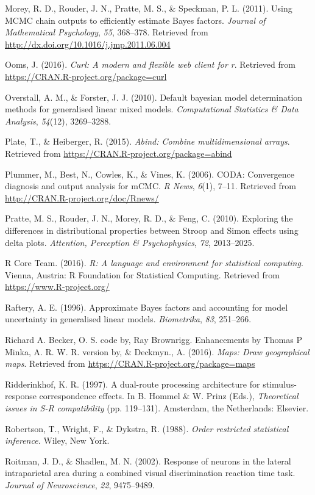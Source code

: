 \documentclass[american,man]{apa6}
\begin{document}
Morey, R. D., Rouder, J. N., Pratte, M. S., \& Speckman, P. L. (2011).
Using MCMC chain outputs to efficiently estimate Bayes factors.
\emph{Journal of Mathematical Psychology}, \emph{55}, 368--378.
Retrieved from \url{http://dx.doi.org/10.1016/j.jmp.2011.06.004}

Ooms, J. (2016). \emph{Curl: A modern and flexible web client for r}.
Retrieved from \url{https://CRAN.R-project.org/package=curl}

Overstall, A. M., \& Forster, J. J. (2010). Default bayesian model
determination methods for generalised linear mixed models.
\emph{Computational Statistics \& Data Analysis}, \emph{54}(12),
3269--3288.

Plate, T., \& Heiberger, R. (2015). \emph{Abind: Combine
multidimensional arrays}. Retrieved from
\url{https://CRAN.R-project.org/package=abind}

Plummer, M., Best, N., Cowles, K., \& Vines, K. (2006). CODA:
Convergence diagnosis and output analysis for mCMC. \emph{R News},
\emph{6}(1), 7--11. Retrieved from
\url{http://CRAN.R-project.org/doc/Rnews/}

Pratte, M. S., Rouder, J. N., Morey, R. D., \& Feng, C. (2010).
Exploring the differences in distributional properties between Stroop
and Simon effects using delta plots. \emph{Attention, Perception \&
Psychophysics}, \emph{72}, 2013--2025.

R Core Team. (2016). \emph{R: A language and environment for statistical
computing}. Vienna, Austria: R Foundation for Statistical Computing.
Retrieved from \url{https://www.R-project.org/}

Raftery, A. E. (1996). Approximate Bayes factors and accounting for
model uncertainty in generalised linear models. \emph{Biometrika},
\emph{83}, 251--266.

Richard A. Becker, O. S. code by, Ray Brownrigg. Enhancements by Thomas
P Minka, A. R. W. R. version by, \& Deckmyn., A. (2016). \emph{Maps:
Draw geographical maps}. Retrieved from
\url{https://CRAN.R-project.org/package=maps}

Ridderinkhof, K. R. (1997). A dual-route processing architecture for
stimulus-response correspondence effects. In B. Hommel \& W. Prinz
(Eds.), \emph{Theoretical issues in S-R compatibility} (pp. 119--131).
Amsterdam, the Netherlands: Elsevier.

Robertson, T., Wright, F., \& Dykstra, R. (1988). \emph{Order restricted
statistical inference.} Wiley, New York.

Roitman, J. D., \& Shadlen, M. N. (2002). Response of neurons in the
lateral intraparietal area during a combined visual discrimination
reaction time task. \emph{Journal of Neuroscience}, \emph{22},
9475--9489.
\end{document}
